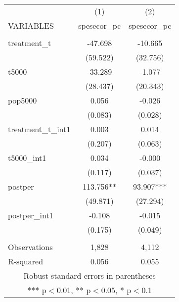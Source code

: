 \documentclass[]{article}
\begin{document}
\begin{tabular}{lcc} \hline
 & (1) & (2) \\
VARIABLES & spesecor\_pc & spesecor\_pc \\ \hline
 &  &  \\
treatment\_t & -47.698 & -10.665 \\
 & (59.522) & (32.756) \\
t5000 & -33.289 & -1.077 \\
 & (28.437) & (20.343) \\
pop5000 & 0.056 & -0.026 \\
 & (0.083) & (0.028) \\
treatment\_t\_int1 & 0.003 & 0.014 \\
 & (0.207) & (0.063) \\
t5000\_int1 & 0.034 & -0.000 \\
 & (0.117) & (0.037) \\
postper & 113.756** & 93.907*** \\
 & (49.871) & (27.294) \\
postper\_int1 & -0.108 & -0.015 \\
 & (0.175) & (0.049) \\
 &  &  \\
Observations & 1,828 & 4,112 \\
 R-squared & 0.056 & 0.055 \\ \hline
\multicolumn{3}{c}{ Robust standard errors in parentheses} \\
\multicolumn{3}{c}{ *** p$<$0.01, ** p$<$0.05, * p$<$0.1} \\
\end{tabular}
\end{document}
